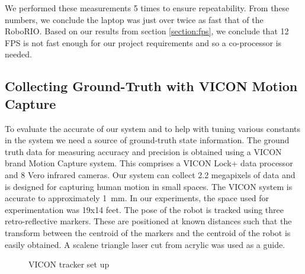 \documentclass{article}
\begin{document}
    We performed these measurements 5 times to ensure repeatability. From these numbers, we conclude the laptop was just over twice as fast that of the RoboRIO. Based on our results from section \ref{section:fps}, we conclude that 12 FPS is not fast enough for our project requirements and so a co-processor is needed.

  \subsection{Collecting Ground-Truth with VICON Motion Capture} \label{section:mocap}

    To evaluate the accurate of our system and to help with tuning various constants in the system we need a source of ground-truth state information. The ground truth data for measuring accuracy and precision is obtained using a VICON brand Motion Capture system. This comprises a VICON Lock+ data processor and 8 Vero infrared cameras. Our system can collect 2.2 megapixels of data and is designed for capturing human motion in small spaces. The VICON system is accurate to approximately \SI{1}{\milli\meter}. In our experiments, the space used for experimentation was 19x14 feet. The pose of the robot is tracked using three retro-reflective markers. These are positioned at known distances such that the transform between the centroid of the markers and the centroid of the robot is easily obtained. A scalene triangle laser cut from acrylic was used as a guide.

    \begin{figure}[H]%
        \centering
        \qquad
        \caption{VICON tracker set up}%
        \label{fig:viconSetup}%
    \end{figure}
\end{document}

